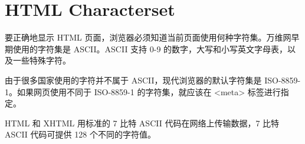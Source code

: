 \chapter{HTML Characterset}










要正确地显示 HTML 页面，浏览器必须知道当前页面使用何种字符集。万维网早期使用的字符集是 ASCII。ASCII 支持 0-9 的数字，大写和小写英文字母表，以及一些特殊字符。

由于很多国家使用的字符并不属于 ASCII，现代浏览器的默认字符集是 ISO-8859-1。如果网页使用不同于 ISO-8859-1 的字符集，就应该在 <meta> 标签进行指定。


HTML 和 XHTML 用标准的 7 比特 ASCII 代码在网络上传输数据，7 比特 ASCII 代码可提供 128 个不同的字符值。

